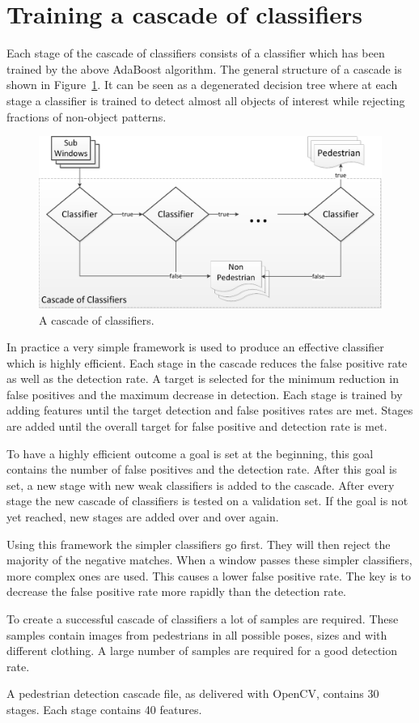 \documentclass{article}
\begin{document}
\section{Training a cascade of classifiers}
Each stage of the cascade of classifiers consists of a classifier which has been trained by the above AdaBoost algorithm. The general structure of a cascade is shown in Figure~\ref{fig:cascade}. It can be seen as a degenerated decision tree where at  each stage a classifier is trained to detect almost all objects of interest while rejecting fractions of non-object patterns.~\cite{viola2001rapid}~\cite{viola2005detecting}
\begin{figure}[h!]
	\centering
	\includegraphics[scale=0.6]{Cascade.png}
	\caption{A cascade of classifiers.}
	\label{fig:cascade}
\end{figure}
\par
In practice a very simple framework is used to produce an effective classifier which is highly efficient. Each stage in the cascade reduces the false positive rate as well as the detection rate. A target is selected for the minimum reduction in false positives and the maximum decrease in detection. Each stage is trained by adding features until the target detection and false positives rates are met. Stages are added until the overall target for false positive and detection rate is met. 
\par
To have a highly efficient outcome a goal is set at the beginning, this goal contains the number of false positives and the detection rate. After this goal is set, a new stage with new weak classifiers is added to the cascade. After every stage the new cascade of classifiers is tested on a validation set. If the goal is not yet reached, new stages are added over and over again.~\cite{monteiro2006vision}
\par
Using this framework the simpler classifiers go first. They will then reject the majority of the negative matches. When a window passes these simpler classifiers, more complex ones are used. This causes a lower false positive rate. The key is to decrease the false positive rate more rapidly than the detection rate.
\par
To create a successful cascade of classifiers a lot of samples are required. These samples contain images from pedestrians in all possible poses, sizes and with different clothing. A large number of samples are required for a good detection rate.
\par
A pedestrian detection cascade file, as delivered with OpenCV, contains 30 stages. Each stage contains 40 features. 
\end{document}
